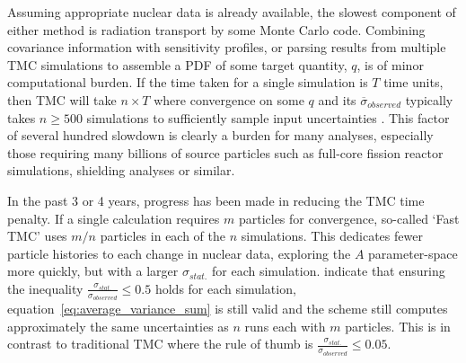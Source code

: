 Assuming appropriate nuclear data is already available, the slowest component of either method is radiation transport by some Monte Carlo code. Combining covariance information with sensitivity profiles, or parsing results from multiple TMC simulations to assemble a PDF of some target quantity, $q$, is of minor computational burden. If the time taken for a single simulation is $T$ time units, then TMC will take $n \times T$ where convergence on some $q$ and its $\overline{\sigma}_{observed}$ typically takes $n \geq 500$ simulations to sufficiently sample input uncertainties \cite{Rochman2014a}. This factor of several hundred slowdown is clearly a burden for many analyses, especially those requiring many billions of source particles such as full-core fission reactor simulations, shielding analyses or similar. 

In the past 3 or 4 years, progress has been made in reducing the TMC time penalty. If a single calculation requires $m$ particles for convergence, so-called `Fast TMC' uses $m/n$ particles in each of the $n$ simulations. This dedicates fewer particle histories to each change in nuclear data, exploring the $A$ parameter-space more quickly, but with a larger $\sigma_{stat.}$ for each simulation. \citeauthor{Rochman2014a} indicate that ensuring the inequality $\frac{\sigma_{stat.}}{\sigma_{observed}} \leq 0.5$ holds for each simulation, equation~\ref{eq:average_variance_sum} is still valid and the scheme still computes approximately the same uncertainties as $n$ runs each with $m$ particles. This is in contrast to traditional TMC where the rule of thumb is $\frac{\sigma_{stat.}}{\sigma_{observed}} \leq 0.05$.

